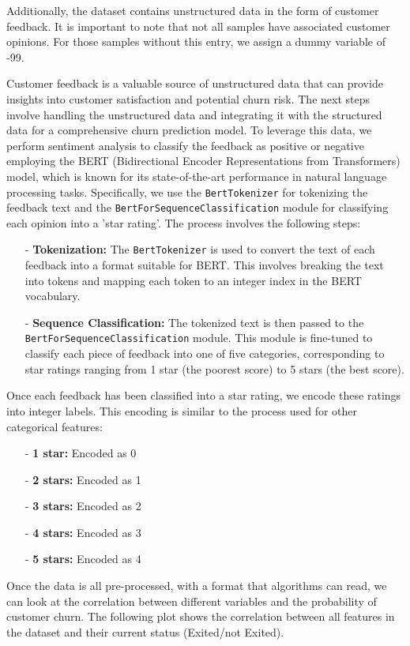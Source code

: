 \documentclass[12pt]{article}
\begin{document}
Additionally, the dataset contains unstructured data in the form of customer feedback. It is important to note that not all samples have associated customer opinions. For those samples without this entry, we assign a dummy variable of -99.


Customer feedback is a valuable source of unstructured data that can provide insights into customer satisfaction and potential churn risk.
The next steps involve handling the unstructured data and integrating it with the structured data for a comprehensive churn prediction model.
To leverage this data, we perform sentiment analysis to classify the feedback as positive or negative employing the BERT (Bidirectional Encoder Representations from Transformers) model, which is known for its state-of-the-art performance in natural language processing tasks. Specifically, we use the \texttt{BertTokenizer} for tokenizing the feedback text and the \texttt{BertForSequenceClassification} module for classifying each opinion into a 'star rating'. The process involves the following steps:
\begin{itemize}
    \item[-] \textbf{Tokenization:} The \texttt{BertTokenizer} is used to convert the text of each feedback into a format suitable for BERT. This involves breaking the text into tokens and mapping each token to an integer index in the BERT vocabulary.
    \item[-] \textbf{Sequence Classification:} The tokenized text is then passed to the \texttt{BertForSequenceClassification} module. This module is fine-tuned to classify each piece of feedback into one of five categories, corresponding to star ratings ranging from 1 star (the poorest score) to 5 stars (the best score).
\end{itemize}  Once each feedback has been classified into a star rating, we encode these ratings into integer labels. This encoding is similar to the process used for other categorical features:
\begin{itemize}
    \item[-] \textbf{1 star:} Encoded as 0
    \item[-] \textbf{2 stars:} Encoded as 1
    \item[-] \textbf{3 stars:} Encoded as 2
    \item[-] \textbf{4 stars:} Encoded as 3
    \item[-] \textbf{5 stars:} Encoded as 4
\end{itemize}


Once the data is all pre-processed, with a format that algorithms can read, we can look at the correlation between different variables and the probability of customer churn. The following plot shows the correlation between all features in the dataset and their current status (Exited/not Exited). 
\end{document}
